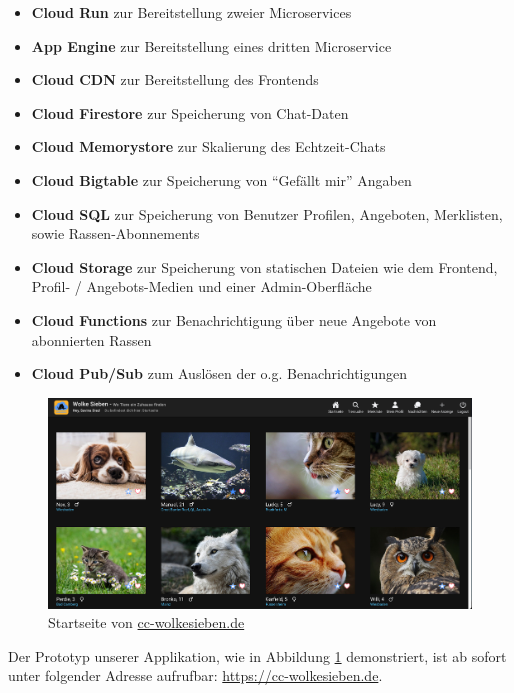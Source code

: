 \documentclass{article}
\begin{document}
\begin{itemize}
    \item \textbf{Cloud Run} zur Bereitstellung zweier Microservices
    \item \textbf{App Engine} zur Bereitstellung eines dritten Microservice
    \item \textbf{Cloud CDN} zur Bereitstellung des Frontends
    \item \textbf{Cloud Firestore} zur Speicherung von Chat-Daten
    \item \textbf{Cloud Memorystore} zur Skalierung des Echtzeit-Chats
    \item \textbf{Cloud Bigtable} zur Speicherung von \enquote{Gefällt mir} Angaben
    \item \textbf{Cloud SQL} zur Speicherung von Benutzer Profilen, Angeboten, Merklisten, sowie Rassen-Abonnements 
    \item \textbf{Cloud Storage} zur Speicherung von statischen Dateien wie dem Frontend, Profil- / Angebots-Medien und einer Admin-Oberfläche
    \item \textbf{Cloud Functions} zur Benachrichtigung über neue Angebote von abonnierten Rassen
    \item \textbf{Cloud Pub/Sub} zum Auslösen der o.g. Benachrichtigungen 
\end{itemize}

\begin{figure}[htbp]
\centering
\includegraphics[width=\textwidth]{images/homepage}
\caption{Startseite von \href{https://cc-wolkesieben.de}{cc-wolkesieben.de}}
\label{fig:homepage}
\end{figure}

Der Prototyp unserer Applikation, wie in Abbildung \ref{fig:homepage} demonstriert, ist ab sofort unter folgender Adresse aufrufbar: \url{https://cc-wolkesieben.de}.

\end{document}
